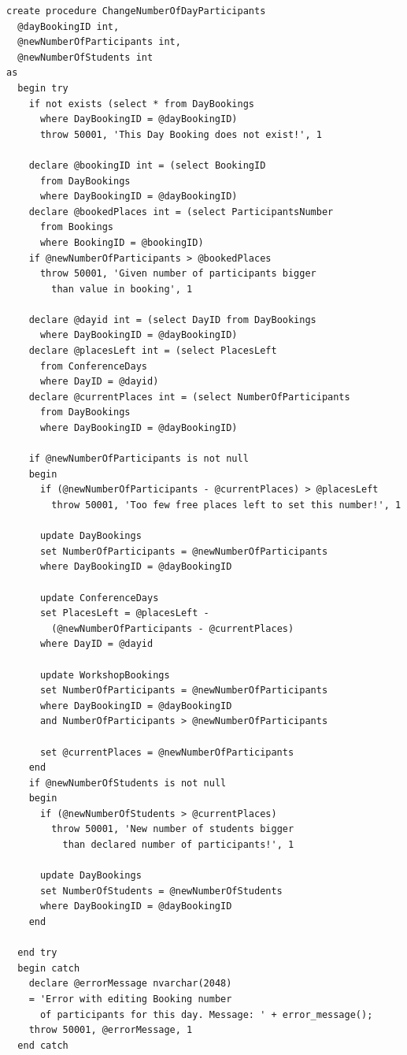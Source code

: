 \documentclass[12pt, a4paper]{mwrep}
\begin{document}
\begin{lstlisting}
create procedure ChangeNumberOfDayParticipants
  @dayBookingID int,
  @newNumberOfParticipants int,
  @newNumberOfStudents int
as
  begin try
    if not exists (select * from DayBookings 
      where DayBookingID = @dayBookingID)
      throw 50001, 'This Day Booking does not exist!', 1

    declare @bookingID int = (select BookingID 
      from DayBookings 
      where DayBookingID = @dayBookingID)
    declare @bookedPlaces int = (select ParticipantsNumber 
      from Bookings 
      where BookingID = @bookingID)
    if @newNumberOfParticipants > @bookedPlaces
      throw 50001, 'Given number of participants bigger 
        than value in booking', 1

    declare @dayid int = (select DayID from DayBookings 
      where DayBookingID = @dayBookingID)
    declare @placesLeft int = (select PlacesLeft 
      from ConferenceDays 
      where DayID = @dayid)
    declare @currentPlaces int = (select NumberOfParticipants 
      from DayBookings 
      where DayBookingID = @dayBookingID)

    if @newNumberOfParticipants is not null
    begin
      if (@newNumberOfParticipants - @currentPlaces) > @placesLeft
        throw 50001, 'Too few free places left to set this number!', 1

      update DayBookings
      set NumberOfParticipants = @newNumberOfParticipants
      where DayBookingID = @dayBookingID

      update ConferenceDays
      set PlacesLeft = @placesLeft - 
        (@newNumberOfParticipants - @currentPlaces)
      where DayID = @dayid

      update WorkshopBookings
      set NumberOfParticipants = @newNumberOfParticipants
      where DayBookingID = @dayBookingID
      and NumberOfParticipants > @newNumberOfParticipants

      set @currentPlaces = @newNumberOfParticipants
    end
    if @newNumberOfStudents is not null
    begin
      if (@newNumberOfStudents > @currentPlaces)
        throw 50001, 'New number of students bigger 
          than declared number of participants!', 1

      update DayBookings
      set NumberOfStudents = @newNumberOfStudents
      where DayBookingID = @dayBookingID
    end

  end try
  begin catch
    declare @errorMessage nvarchar(2048)
    = 'Error with editing Booking number 
      of participants for this day. Message: ' + error_message();
    throw 50001, @errorMessage, 1
  end catch
\end{lstlisting}
\end{document}

